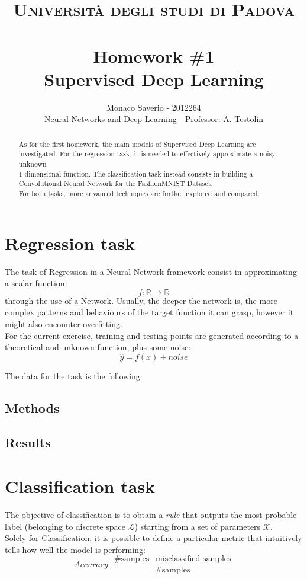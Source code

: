 \documentclass[11pt,a4paper,twocolumn]{IEEEtran}
\author{Monaco Saverio - 2012264 \sepline \\Neural Networks and Deep Learning - Professor: A. Testolin}
\title{{\normalsize\textsc{Università degli studi di Padova}}\vspace{-.5cm} \\ \sepline\\ \textbf{Homework \#1
\\ Supervised Deep Learning}}
\begin{document}
	\maketitle
	\begin{abstract} As for the first homework, the main models of Supervised Deep Learning are investigated. For the regression task, it is needed to effectively approximate a noisy unknown\\ 1-dimensional function. The classification task instead consists in building a Convolutional Neural Network for the FashionMNIST Dataset.\\
	For both tasks, more advanced techniques are further explored and compared.
	\end{abstract}
			\section{\textbf{Regression task}}
			The task of Regression in a Neural Network framework consist in approximating a scalar function:
			$$f:\mathbb{R}\to\mathbb{R}$$
			through the use of a Network. Usually, the deeper the network is, the more complex patterns and behaviours of the target function it can grasp, however it might also encounter overfitting.\\
			 For the current exercise, training and testing points are generated according to a theoretical and unknown function, plus some noise:
			$$\hat{y}=f(x) + noise$$
			
			The data for the task is the following:\vspace*{-.5cm}
			\begin{figure}[h]
				\centering
				
			\end{figure}
			
			\subsection{\textbf{Methods}}
			\subsection{\textbf{Results}}
			
	\section{\textbf{Classification task}}
		The objective of classification is to obtain a \textit{rule} that outputs the most probable label (belonging to discrete space $\mathcal{L}$) starting from a set of parameters $\mathcal{X}$.\\
		Solely for Classification, it is possible to define a particular metric that intuitively tells how well the model is performing:
		$$Accuracy: \frac{\text{\#samples} - \text{misclassified\_samples}}{\text{\#samples}}$$
\end{document}
